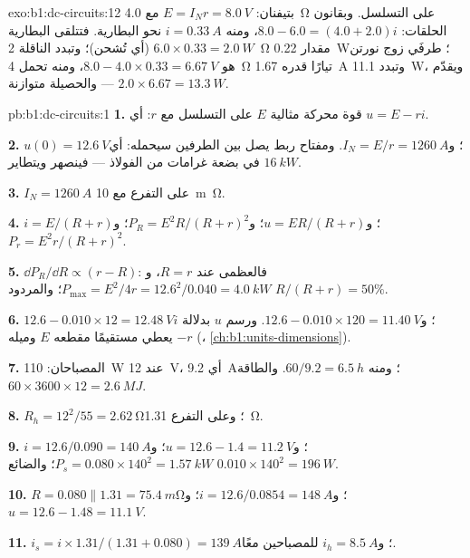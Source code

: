 \begin{solution}{exo:b1:dc-circuits:12}
بتيفنان: $E = I_N r = \qty{8.0}{V}$ مع \qty{4.0}{\ohm} على التسلسل.
وبقانون الحلقات: $8.0 - 6.0 = (4.0 + 2.0)i$، ومنه $i = \qty{0.33}{A}$ نحو البطارية.
فتتلقى البطارية $6.0 \times 0.33 = \qty{2.0}{W}$ (أي تُشحن)؛ وتبدد
الناقلة \qty{2}{\ohm} مقدار \qty{0.22}{W}؛  طرفَي
زوج نورتن هو $8.0 - 4.0 \times 0.33 = \qty{6.67}{V}$، ومنه تحمل
\qty{4}{\ohm} تيارًا قدره \qty{1.67}{A} وتبدد \qty{11.1}{W}، ويقدّم
 $2.0 \times 6.67 = \qty{13.3}{W}$ --- والحصيلة
متوازنة.
\end{solution}

\begin{solution}{pb:b1:dc-circuits:1}
\textbf{1.} قوة محركة مثالية $E$ على التسلسل مع $r$: أي $u = E - ri$.

\textbf{2.} $u(0) = \qty{12.6}{V}$؛ و$I_N = E/r = \qty{1260}{A}$. ومفتاح ربط
يصل بين الطرفين سيحمله: أي $\qty{16}{kW}$ في بضعة غرامات من
الفولاذ --- فينصهر ويتطاير.

\textbf{3.}  $I_N = \qty{1260}{A}$ على التفرع مع
\qty{10}{m\ohm}.

\textbf{4.} $i = E/(R + r)$؛ و$u = ER/(R + r)$؛ و$P_R = E^2R/(R + r)^2$؛
و$P_r = E^2r/(R + r)^2$.

\textbf{5.} $\dd P_R/\dd R \propto (r - R)$: فالعظمى عند $R = r$، و
$P_{\max} = E^2/4r = 12.6^2/0.040 = \qty{4.0}{kW}$؛ والمردود
$R/(R + r) = 50\%$.

\textbf{6.} $12.6 - 0.010 \times 12 = \qty{12.48}{V}$؛ و$12.6 - 0.010 \times
120 = \qty{11.40}{V}$. ورسم $u$ بدلالة $i$ يعطي مستقيمًا
مقطعه $E$ وميله $-r$ (، \cref{ch:b1:units-dimensions}).

\textbf{7.} المصباحان: \qty{110}{W} عند \qty{12}{V}، أي \qty{9.2}{A}؛
ومنه $60/9.2 = \qty{6.5}{h}$. والطاقة $60 \times 3600 \times 12 = \qty{2.6}{MJ}$.

\textbf{8.} $R_h = 12^2/55 = \qty{2.62}{\ohm}$؛ وعلى التفرع \qty{1.31}{\ohm}.

\textbf{9.} $i = 12.6/0.090 = \qty{140}{A}$؛ و$u = 12.6 - 1.4 = \qty{11.2}{V}$؛
و$P_s = 0.080 \times 140^2 = \qty{1.57}{kW}$؛ والضائع $0.010 \times 140^2 =
\qty{196}{W}$.

\textbf{10.} $R = 0.080 \parallel 1.31 = \qty{75.4}{m\ohm}$؛ و$i = 12.6/0.0854
= \qty{148}{A}$؛ و$u = 12.6 - 1.48 = \qty{11.1}{V}$.

\textbf{11.} $i_s = i \times 1.31/(1.31 + 0.080) = \qty{139}{A}$؛ و$i_h =
\qty{8.5}{A}$ للمصباحين معًا.


\end{solution}
